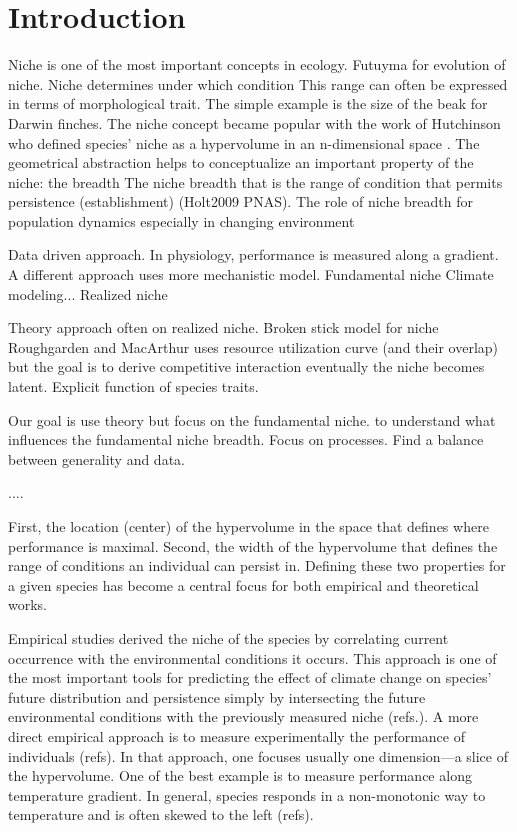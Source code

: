 \section*{Introduction}


Niche is one of the most important concepts in ecology.
Futuyma for evolution of niche.
Niche determines under which condition 
This range can often be expressed in terms of morphological trait. 
The simple example is the size of the beak for Darwin finches.
The niche concept became popular with the work of Hutchinson who defined species' niche as a hypervolume in an n-dimensional space \citep{Hutchinson1957}.
The geometrical abstraction helps to conceptualize an important property of the niche: the breadth
The niche breadth that is the range of condition that permits persistence (establishment) (Holt2009 PNAS).
The role of niche breadth for population dynamics especially in changing environment 
      
Data driven approach.
In physiology, performance is measured along a gradient.
A different approach uses more mechanistic model.
Fundamental niche
Climate modeling...
Realized niche

Theory approach often on realized niche.
Broken stick model for niche
Roughgarden and MacArthur uses resource utilization curve (and their overlap) but the goal is to derive competitive interaction eventually the niche becomes latent. 
Explicit function of species traits.    

Our goal is use theory but focus on the fundamental niche.
to understand what influences the fundamental niche breadth.
Focus on processes.
Find a balance between generality and data. 

....   
  
  
First, the location (center) of the hypervolume in the space that defines where performance is maximal.
Second, the width of the hypervolume that defines the range of conditions an individual can persist in. 
Defining these two properties for a given species has become a central focus for both empirical and theoretical works.


Empirical studies derived the niche of the species by correlating current occurrence with the environmental conditions it occurs. 
This approach is one of the most important tools for predicting the effect of climate change on species' future distribution and persistence simply by intersecting the future environmental conditions with the previously measured niche (refs.).
A more direct empirical approach is to measure experimentally the performance of individuals (refs).
In that approach, one focuses usually one dimension---a slice of the hypervolume.
One of the best example is to measure performance along temperature gradient. 
In general, species responds in a non-monotonic way to temperature and is often skewed to the left (refs).

